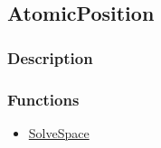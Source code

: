 \subsection{AtomicPosition}\label{AtomicPosition}
\subsubsection{Description}


\subsubsection{Functions}
\begin{itemize}
\item \hyperref[SolveSpace]{SolveSpace}
\end{itemize}

